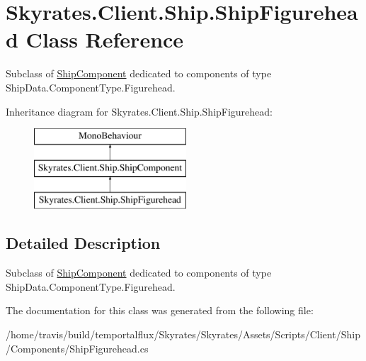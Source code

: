 \hypertarget{class_skyrates_1_1_client_1_1_ship_1_1_ship_figurehead}{\section{Skyrates.\-Client.\-Ship.\-Ship\-Figurehead Class Reference}
\label{class_skyrates_1_1_client_1_1_ship_1_1_ship_figurehead}
}


Subclass of \hyperlink{class_skyrates_1_1_client_1_1_ship_1_1_ship_component}{Ship\-Component} dedicated to components of type Ship\-Data.\-Component\-Type.\-Figurehead.  


Inheritance diagram for Skyrates.\-Client.\-Ship.\-Ship\-Figurehead\-:\begin{figure}[H]
\begin{center}
\leavevmode
\includegraphics[height=3.000000cm]{class_skyrates_1_1_client_1_1_ship_1_1_ship_figurehead}
\end{center}
\end{figure}


\subsection{Detailed Description}
Subclass of \hyperlink{class_skyrates_1_1_client_1_1_ship_1_1_ship_component}{Ship\-Component} dedicated to components of type Ship\-Data.\-Component\-Type.\-Figurehead. 



The documentation for this class was generated from the following file\-:\begin{DoxyCompactItemize}
\item 
/home/travis/build/temportalflux/\-Skyrates/\-Skyrates/\-Assets/\-Scripts/\-Client/\-Ship/\-Components/Ship\-Figurehead.\-cs\end{DoxyCompactItemize}

